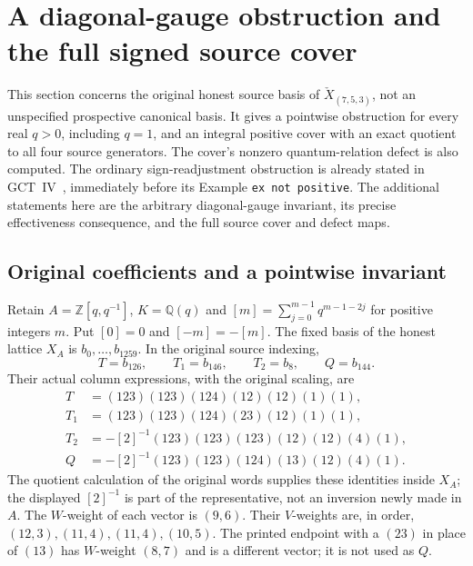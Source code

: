 \section{A diagonal-gauge obstruction and the full signed source cover}
\label{sec:positive-source-cover}

This section concerns the original honest source basis of
$\check X_{(7,5,3)}$, not an unspecified prospective canonical basis.
It gives a pointwise obstruction for every real $q>0$, including $q=1$,
and an integral positive cover with an exact quotient to all four source
generators. The cover's nonzero quantum-relation defect is also computed.
The ordinary sign-readjustment obstruction is already stated in
GCT~IV~\cite{blasiakmulmuleysohoni2013gct4}, immediately before its
Example \texttt{ex not positive}. The additional statements here are
the arbitrary diagonal-gauge invariant, its precise effectiveness
consequence, and the full source cover and defect maps.

\subsection{Original coefficients and a pointwise invariant}

Retain $A=\mathbb Z[q,q^{-1}]$, $K=\mathbb Q(q)$ and
$[m]=\sum_{j=0}^{m-1}q^{m-1-2j}$ for positive integers $m$.
Put $[0]=0$ and $[-m]=-[m]$. The fixed basis of the honest lattice
$X_A$ is $b_0,\ldots,b_{1259}$. In the original source indexing,
\[
 T=b_{126},\qquad T_1=b_{146},\qquad T_2=b_8,\qquad Q=b_{144}.
\]
Their actual column expressions, with the original scaling, are
\begin{align*}
 T&=(123)(123)(124)(12)(12)(1)(1),\\
 T_1&=(123)(123)(124)(23)(12)(1)(1),\\
 T_2&=-[2]^{-1}(123)(123)(123)(12)(12)(4)(1),\\
 Q&=-[2]^{-1}(123)(123)(124)(13)(12)(4)(1).
\end{align*}
The quotient calculation of the original words supplies these identities
inside $X_A$; the displayed $[2]^{-1}$ is part of the representative,
not an inversion newly made in $A$. The $W$-weight of each vector is
$(9,6)$. Their $V$-weights are, in order, $(12,3),(11,4),(11,4),(10,5)$.
The printed endpoint with a $(23)$ in place of $(13)$ has $W$-weight
$(8,7)$ and is a different vector; it is not used as $Q$.

